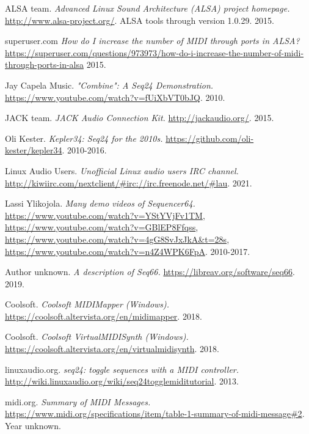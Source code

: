 {\RaggedRight
\begin{thebibliography}{99}

   ALSA team.
   \emph{Advanced Linux Sound Architecture (ALSA) project homepage.}
   \url{http://www.alsa-project.org/}.
   ALSA tools through version 1.0.29.
   2015.

   superuser.com
   \emph{How do I increase the number of MIDI through ports in ALSA?}
   \url{https://superuser.com/questions/973973/how-do-i-increase-the-number-of-midi-through-ports-in-alsa}
   2015.

   Jay Capela Music.
   \emph{"Combine": A Seq24 Demonstration.}
   \url{https://www.youtube.com/watch?v=fUiXbVT0bJQ}.
   2010.

   JACK team.
   \emph{JACK Audio Connection Kit.}
   \url{http://jackaudio.org/}.
   2015.

   Oli Kester.
   \emph{Kepler34: Seq24 for the 2010s.}
   \url{https://github.com/oli-kester/kepler34}.
   2010-2016.

   Linux Audio Users.
   \emph{Unofficial Linux audio users IRC channel.}
   \url{http://kiwiirc.com/nextclient/#irc://irc.freenode.net/#lau}.
   2021.

   Lassi Ylikojola.
   \emph{Many demo videos of Sequencer64.}
   \url{https://www.youtube.com/watch?v=YStYVjFv1TM},
   \url{https://www.youtube.com/watch?v=GBlEP8Ffqss},
   \url{https://www.youtube.com/watch?v=4gG8SvJxJkA&t=28s},
   \url{https://www.youtube.com/watch?v=n4Z4WPK6FpA}.
   2010-2017.

   Author unknown.
   \emph{A description of Seq66.}
   \url{https://libreav.org/software/seq66}.
   2019.

   Coolsoft.
   \emph{Coolsoft MIDIMapper (Windows).}
   \url{https://coolsoft.altervista.org/en/midimapper}.
   2018.

   Coolsoft.
   \emph{Coolsoft VirtualMIDISynth (Windows).}
   \url{https://coolsoft.altervista.org/en/virtualmidisynth}.
   2018.

   linuxaudio.org.
   \emph{seq24: toggle sequences with a MIDI controller.}
   \url{http://wiki.linuxaudio.org/wiki/seq24togglemiditutorial}.
   2013.

   midi.org.
   \emph{Summary of MIDI Messages.}
   \url{https://www.midi.org/specifications/item/table-1-summary-of-midi-message#2}.
   Year unknown.


\end{thebibliography}}
